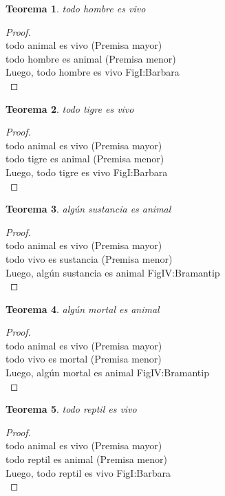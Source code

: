 ﻿\documentclass[12pt]{book}
\newtheorem{theorem}{Teorema}[chapter]
\newtheorem{proof}{Demostración}
\begin{document}
\begin{theorem}
todo hombre es vivo
\label{th: 19}
\end{theorem}\begin{proof}\\todo animal es vivo	 (Premisa mayor) \\todo hombre es animal	 (Premisa menor) \\Luego, todo hombre es vivo	FigI:Barbara \\ \end{proof}
\begin{theorem}
todo tigre es vivo
\label{th: 20}
\end{theorem}\begin{proof}\\todo animal es vivo	 (Premisa mayor) \\todo tigre es animal	 (Premisa menor) \\Luego, todo tigre es vivo	FigI:Barbara \\ \end{proof}
\begin{theorem}
algún sustancia es animal
\label{th: 21}
\end{theorem}\begin{proof}\\todo animal es vivo	 (Premisa mayor) \\todo vivo es sustancia	 (Premisa menor) \\Luego, algún sustancia es animal	FigIV:Bramantip \\ \end{proof}
\begin{theorem}
algún mortal es animal
\label{th: 22}
\end{theorem}\begin{proof}\\todo animal es vivo	 (Premisa mayor) \\todo vivo es mortal	 (Premisa menor) \\Luego, algún mortal es animal	FigIV:Bramantip \\ \end{proof}
\begin{theorem}
todo reptil es vivo
\label{th: 23}
\end{theorem}\begin{proof}\\todo animal es vivo	 (Premisa mayor) \\todo reptil es animal	 (Premisa menor) \\Luego, todo reptil es vivo	FigI:Barbara \\ \end{proof}
\end{document}
